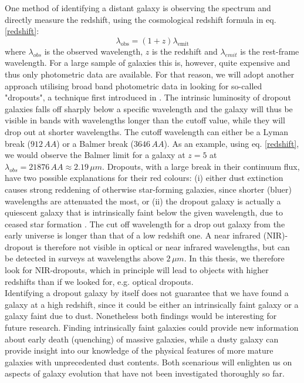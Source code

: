One method of identifying a distant galaxy is observing the spectrum and directly measure the redshift, using the cosmological redshift formula in eq. \ref{redshift}:
\begin{equation}
    \lambda_\mathrm{obs} = (1+z)  \lambda_\mathrm{emit}
    \label{redshift}
\end{equation}
where $\lambda_{obs}$ is the observed wavelength, $z$ is the redshift and $\lambda_{emit}$ is the rest-frame wavelength. For a large sample of galaxies this is, however, quite expensive and thus only photometric data are available. For that reason, we will adopt another approach utilising broad band photometric data in looking for so-called "dropouts", a technique first introduced in \cite{Steidel_1996_dropout}. The intrinsic luminosity of dropout galaxies falls off sharply below a specific wavelength and the galaxy will thus be visible in bands with wavelengths longer than the cutoff value, while they will drop out at shorter wavelengths. The cutoff wavelength can either be a Lyman break ($912\,\si{AA}$) or a Balmer break ($3646\,\si{AA}$). As an example, using eq. \ref{redshift}, we would observe the Balmer limit for a galaxy at $z=5$ at $\lambda_{obs}=21876\,\si{AA}\approx2.19\,\si{\mu m}$. Dropouts, with a large break in their continuum flux, have two possible explanations for their red colours: (i) either dust extinction causes strong reddening of otherwise star-forming galaxies, since shorter (bluer) wavelengths are attenuated the most, or (ii) the dropout galaxy is actually a quiescent galaxy that is intrinsically faint below the given wavelength, due to ceased star formation \cite{mo_van_den_bosch_white_2010_MBW_BOOK}. The cut off wavelength for a drop out galaxy from the early universe is longer than that of a low redshift one. A near infrared (NIR)-dropout is therefore not visible in optical or near infrared wavelengths, but can be detected in surveys at wavelengths above $2\,\si{\mu m}$. In this thesis, we therefore look for NIR-dropouts, which in principle will lead to objects with higher redshifts than if we looked for, e.g. optical dropouts. \\
Identifying a dropout galaxy by itself does not guarantee that we have found a galaxy at a high redshift, since it could be either an intrinsically faint galaxy or a galaxy faint due to dust. Nonetheless both findings would be interesting for future research. Finding intrinsically faint galaxies could provide new information about early death (quenching) of massive galaxies, while a dusty galaxy can provide insight into our knowledge of the physical features of more mature galaxies with unprecedented dust contents. Both scenarious will enlighten us on aspects of galaxy evolution that have not been investigated thoroughly so far. \\ \\

